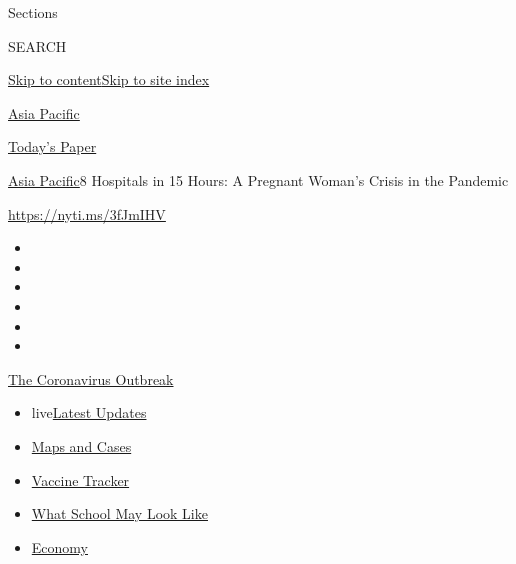 Sections

SEARCH

\protect\hyperlink{site-content}{Skip to
content}\protect\hyperlink{site-index}{Skip to site index}

\href{https://www.nytimes.com/section/world/asia}{Asia Pacific}

\href{https://myaccount.nytimes.com/auth/login?response_type=cookie\&client_id=vi}{}

\href{https://www.nytimes.com/section/todayspaper}{Today's Paper}

\href{/section/world/asia}{Asia Pacific}\textbar{}8 Hospitals in 15
Hours: A Pregnant Woman's Crisis in the Pandemic

\url{https://nyti.ms/3fJmIHV}

\begin{itemize}
\item
\item
\item
\item
\item
\item
\end{itemize}

\href{https://www.nytimes.com/news-event/coronavirus?action=click\&pgtype=Article\&state=default\&region=TOP_BANNER\&context=storylines_menu}{The
Coronavirus Outbreak}

\begin{itemize}
\tightlist
\item
  live\href{https://www.nytimes.com/2020/08/02/world/coronavirus-updates.html?action=click\&pgtype=Article\&state=default\&region=TOP_BANNER\&context=storylines_menu}{Latest
  Updates}
\item
  \href{https://www.nytimes.com/interactive/2020/us/coronavirus-us-cases.html?action=click\&pgtype=Article\&state=default\&region=TOP_BANNER\&context=storylines_menu}{Maps
  and Cases}
\item
  \href{https://www.nytimes.com/interactive/2020/science/coronavirus-vaccine-tracker.html?action=click\&pgtype=Article\&state=default\&region=TOP_BANNER\&context=storylines_menu}{Vaccine
  Tracker}
\item
  \href{https://www.nytimes.com/interactive/2020/07/29/us/schools-reopening-coronavirus.html?action=click\&pgtype=Article\&state=default\&region=TOP_BANNER\&context=storylines_menu}{What
  School May Look Like}
\item
  \href{https://www.nytimes.com/live/2020/07/31/business/stock-market-today-coronavirus?action=click\&pgtype=Article\&state=default\&region=TOP_BANNER\&context=storylines_menu}{Economy}
\end{itemize}

